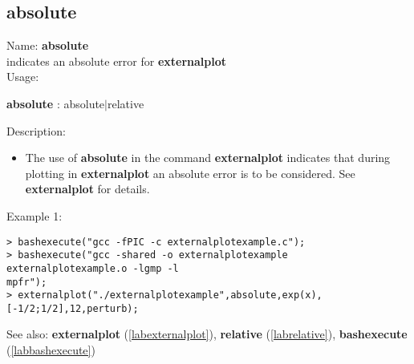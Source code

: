 \subsection{absolute}
\label{lababsolute}
\noindent Name: \textbf{absolute}\\
indicates an absolute error for \textbf{externalplot}\\

\noindent Usage: 
\begin{center}
\textbf{absolute} : \textsf{absolute$|$relative}\\
\end{center}
\noindent Description: \begin{itemize}

\item The use of \textbf{absolute} in the command \textbf{externalplot} indicates that during
   plotting in \textbf{externalplot} an absolute error is to be considered.
   See \textbf{externalplot} for details.
\end{itemize}
\noindent Example 1: 
\begin{center}\begin{minipage}{15cm}\begin{Verbatim}[frame=single]
> bashexecute("gcc -fPIC -c externalplotexample.c");
> bashexecute("gcc -shared -o externalplotexample externalplotexample.o -lgmp -l
mpfr");
> externalplot("./externalplotexample",absolute,exp(x),[-1/2;1/2],12,perturb);
\end{Verbatim}
\end{minipage}\end{center}
See also: \textbf{externalplot} (\ref{labexternalplot}), \textbf{relative} (\ref{labrelative}), \textbf{bashexecute} (\ref{labbashexecute})
